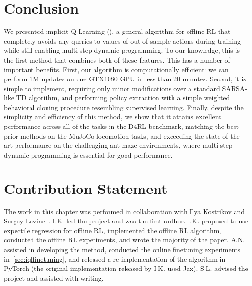 \section{Conclusion}

We presented implicit Q-Learning (\ourname), a general algorithm for offline RL that completely avoids any queries to values of out-of-sample actions during training while still enabling multi-step dynamic programming. To our knowledge, this is the first method that combines both of these features. This has a number of important benefits. First, our algorithm is computationally efficient: we can perform 1M updates on one GTX1080 GPU in less than 20 minutes. Second, it is simple to implement, requiring only minor modifications over a standard SARSA-like TD algorithm, and performing policy extraction with a simple weighted behavioral cloning procedure resembling supervised learning. 
Finally, despite the simplicity and efficiency of this method, we show that it attains excellent performance across all of the tasks in the D4RL benchmark, matching the best prior methods on the MuJoCo locomotion tasks, and exceeding the state-of-the-art performance on the challenging ant maze environments, where multi-step dynamic programming is essential for good performance.

\section{Contribution Statement}

The work in this chapter was performed in collaboration with Ilya Kostrikov and Sergey Levine~\citep{kostrikov2021iql}. I.K. led the project and was the first author. I.K. proposed to use expectile regression for offline RL, implemented the offline RL algorithm, conducted the offline RL experiments, and wrote the majority of the paper. A.N. assisted in developing the method, conducted the online finetuning experiments in~\ref{sec:iqlfinetuning}, and released a re-implementation of the algorithm in PyTorch (the original implementation released by I.K. used Jax). S.L. advised the project and assisted with writing.

